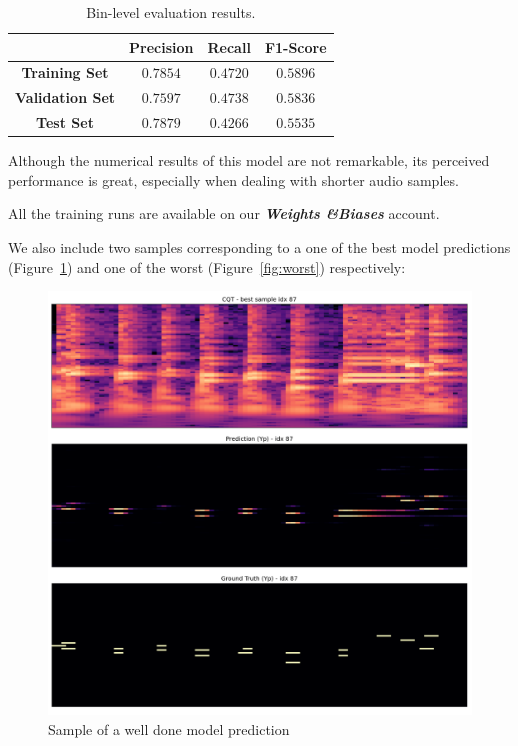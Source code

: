 \documentclass[10pt,twocolumn,letterpaper]{article}
\begin{document}
\begin{table}[h]
\centering
\begin{tabular}{|c|c|c|c|}
\hline
& \textbf{Precision} & \textbf{Recall} & \textbf{F1-Score} \\ \hline
\textbf{Training Set} & $\num{0.7854}$ & $\num{0.4720}$ & $\num{0.5896}$ \\ \hline
\textbf{Validation Set} & $\num{0.7597}$ & $\num{0.4738}$ & $\num{0.5836}$ \\ \hline
\textbf{Test Set} & $\num{0.7879}$ & $\num{0.4266}$ & $\num{0.5535}$ \\ \hline
\end{tabular}
\caption{Bin-level evaluation results.}
\label{tab:bin_results}
\end{table}

Although the numerical results of this model are not remarkable, its perceived performance is great, especially when dealing with shorter audio samples.

All the training runs are available on our \textbf{\textit{Weights \&\;Biases}} account\;\cite{wandb-link}.

We also include two samples corresponding to a one of the best model predictions (Figure~\ref{fig:best}) and one of the worst (Figure~\ref{fig:worst}) respectively:

\begin{figure}[ht]
\begin{center}
  \includegraphics[width=0.9\linewidth]{images/best__87.png}
\end{center}
  \caption{Sample of a well done model prediction}\label{fig:best}
\end{figure}%
\end{document}
